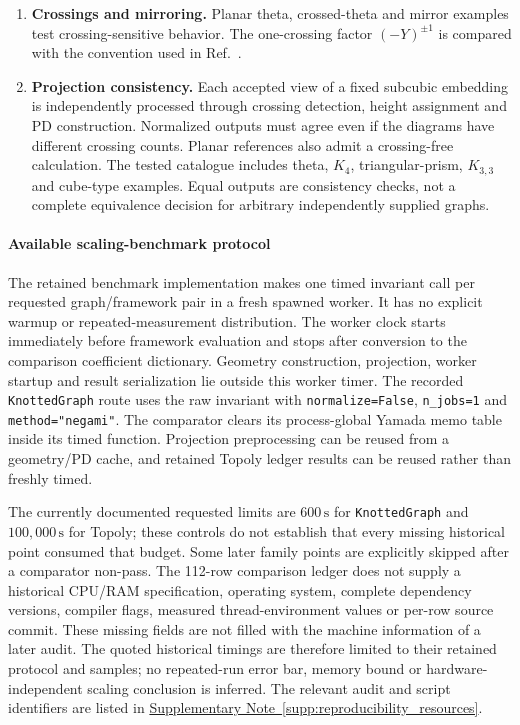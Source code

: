 \documentclass[10pt,twocolumn]{article}
\providecommand{\SuppSubsecref}[1]{\hyperref[#1]{Supplementary Note~\ref*{#1}}}
\begin{document}
\begin{enumerate}[leftmargin=*,label=\textbf{(\arabic*)}]
\item \textbf{Crossings and mirroring.} Planar theta, crossed-theta and mirror examples test crossing-sensitive behavior. The one-crossing factor $(-Y)^{\pm1}$ is compared with the convention used in Ref.~\cite{kg_peddada2023}.

\item \textbf{Projection consistency.} Each accepted view of a fixed subcubic embedding is independently processed through crossing detection, height assignment and PD construction. Normalized outputs must agree even if the diagrams have different crossing counts. Planar references also admit a crossing-free calculation. The tested catalogue includes theta, $K_4$, triangular-prism, $K_{3,3}$ and cube-type examples. Equal outputs are consistency checks, not a complete equivalence decision for arbitrary independently supplied graphs.
\end{enumerate}

\paragraph{Available scaling-benchmark protocol}
The retained benchmark implementation makes one timed invariant call per requested graph/framework pair in a fresh spawned worker. It has no explicit warmup or repeated-measurement distribution. The worker clock starts immediately before framework evaluation and stops after conversion to the comparison coefficient dictionary. Geometry construction, projection, worker startup and result serialization lie outside this worker timer. The recorded \texttt{KnottedGraph} route uses the raw invariant with \texttt{normalize=False}, \texttt{n\_jobs=1} and \texttt{method="negami"}. The comparator clears its process-global Yamada memo table inside its timed function. Projection preprocessing can be reused from a geometry/PD cache, and retained Topoly ledger results can be reused rather than freshly timed.

The currently documented requested limits are $600\,\mathrm{s}$ for \texttt{KnottedGraph} and $100{,}000\,\mathrm{s}$ for Topoly; these controls do not establish that every missing historical point consumed that budget. Some later family points are explicitly skipped after a comparator non-pass. The 112-row comparison ledger does not supply a historical CPU/RAM specification, operating system, complete dependency versions, compiler flags, measured thread-environment values or per-row source commit. These missing fields are not filled with the machine information of a later audit. The quoted historical timings are therefore limited to their retained protocol and samples; no repeated-run error bar, memory bound or hardware-independent scaling conclusion is inferred. The relevant audit and script identifiers are listed in \SuppSubsecref{supp:reproducibility_resources}.
\end{document}
